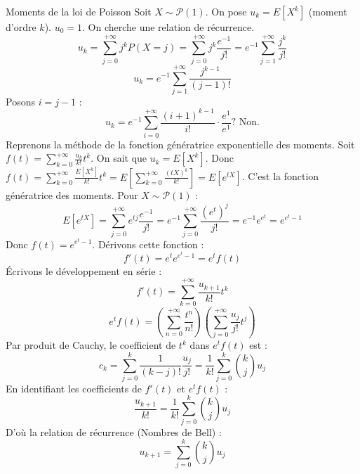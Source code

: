 \begin{correction}{Moments de la loi de Poisson}
Soit $X \sim \mathcal{P}(1)$. On pose $u_k = E[X^k]$ (moment d'ordre $k$).
$u_0 = 1$.
On cherche une relation de récurrence.
$$ u_k = \sum_{j=0}^{+ \infty} j^k P(X=j) = \sum_{j=0}^{+ \infty} j^k \frac{e^{-1}}{j!} = e^{-1} \sum_{j=1}^{+ \infty} \frac{j^k}{j!} $$
$$ u_k = e^{-1} \sum_{j=1}^{+ \infty} \frac{j^{k-1}}{(j-1)!} $$
Posons $i = j-1$ :
$$ u_k = e^{-1} \sum_{i=0}^{+ \infty} \frac{(i+1)^{k-1}}{i!} \cdot \frac{e^1}{e^1} ? \text{ Non.} $$
Reprenons la méthode de la fonction génératrice exponentielle des moments.
Soit $f(t) = \sum_{k=0}^{+ \infty} \frac{u_k}{k!} t^k$.
On sait que $u_k = E[X^k]$.
Donc $f(t) = \sum_{k=0}^{+ \infty} \frac{E[X^k]}{k!} t^k = E\left[ \sum_{k=0}^{+ \infty} \frac{(tX)^k}{k!} \right] = E[e^{tX}]$.
C'est la fonction génératrice des moments.
Pour $X \sim \mathcal{P}(1)$ :
$$ E[e^{tX}] = \sum_{j=0}^{+ \infty} e^{tj} \frac{e^{-1}}{j!} = e^{-1} \sum_{j=0}^{+ \infty} \frac{(e^t)^j}{j!} = e^{-1} e^{e^t} = e^{e^t - 1} $$
Donc $f(t) = e^{e^t - 1}$.
Dérivons cette fonction :
$$ f'(t) = e^t e^{e^t - 1} = e^t f(t) $$
Écrivons le développement en série :
$$ f'(t) = \sum_{k=0}^{+ \infty} \frac{u_{k+1}}{k!} t^k $$
$$ e^t f(t) = \left( \sum_{n=0}^{+ \infty} \frac{t^n}{n!} \right) \left( \sum_{j=0}^{+ \infty} \frac{u_j}{j!} t^j \right) $$
Par produit de Cauchy, le coefficient de $t^k$ dans $e^t f(t)$ est :
$$ c_k = \sum_{j=0}^k \frac{1}{(k-j)!} \frac{u_j}{j!} = \frac{1}{k!} \sum_{j=0}^k \binom{k}{j} u_j $$
En identifiant les coefficients de $f'(t)$ et $e^t f(t)$ :
$$ \frac{u_{k+1}}{k!} = \frac{1}{k!} \sum_{j=0}^k \binom{k}{j} u_j $$
D'où la relation de récurrence (Nombres de Bell) :
$$ u_{k+1} = \sum_{j=0}^k \binom{k}{j} u_j $$
\end{correction}


